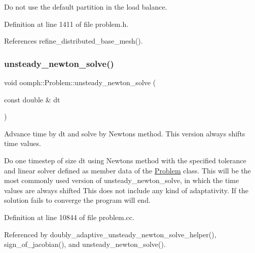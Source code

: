 Do not use the default partition in the load balance. 



Definition at line 1411 of file problem.\+h.



References refine\+\_\+distributed\+\_\+base\+\_\+mesh().

\mbox{\label{classoomph_1_1Problem_aef22157aadc15a512cca93e4c423ff73}} 
\subsubsection{\texorpdfstring{unsteady\+\_\+newton\+\_\+solve()}{unsteady\_newton\_solve()}\hspace{0.1cm}{\footnotesize\ttfamily [1/3]}}
{\footnotesize\ttfamily void oomph\+::\+Problem\+::unsteady\+\_\+newton\+\_\+solve (\begin{DoxyParamCaption}\item[{const double \&}]{dt }\end{DoxyParamCaption})}



Advance time by dt and solve by Newton\textquotesingle{}s method. This version always shifts time values. 

Do one timestep of size dt using Newton\textquotesingle{}s method with the specified tolerance and linear solver defined as member data of the \hyperlink{classoomph_1_1Problem}{Problem} class. This will be the most commonly used version of unsteady\+\_\+newton\+\_\+solve, in which the time values are always shifted This does not include any kind of adaptativity. If the solution fails to converge the program will end. 

Definition at line 10844 of file problem.\+cc.



Referenced by doubly\+\_\+adaptive\+\_\+unsteady\+\_\+newton\+\_\+solve\+\_\+helper(), sign\+\_\+of\+\_\+jacobian(), and unsteady\+\_\+newton\+\_\+solve().

\mbox{\label{classoomph_1_1Problem_abf8b8c9ee09df0ba8934382740a588de}} 
